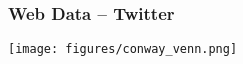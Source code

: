 \documentclass{beamer}
\begin{document}
	

  

\begin{frame}
	\frametitle{Web Data -- Twitter}
	\pause 
	\texttt{[image: figures/conway\_venn.png]} \\
\end{frame}
\end{document}
